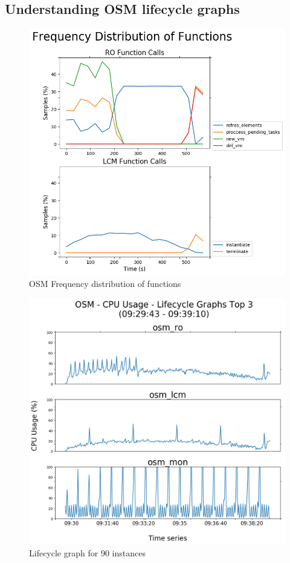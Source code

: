 \subsection{Understanding OSM lifecycle graphs}

\begin{figure}[h]
\centering
\includegraphics[width=1\linewidth]{figures/scalability_graphs/Lifecycle-Graphs-Top-3/osm-frequency-dist}
\caption{OSM Frequency distribution of functions}
\label{fig:osm-frequency-dist}
\end{figure}

\begin{figure}[h]
\centering
\includegraphics[width=1\linewidth]{figures/scalability_graphs/Lifecycle-Graphs-Top-3/OSM-TOP-3-Lifecycle-90}
\caption{Lifecycle graph for 90 instances}
\label{fig:osm-top-3-lifecycle-90}
\end{figure}
